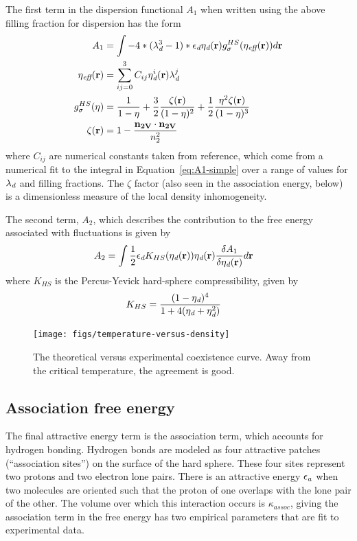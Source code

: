 \documentclass[letterpaper,twocolumn,amsmath,amssymb,prb]{revtex4-1}
\newcommand{\xx}{\textbf{r}}
\begin{document}
The first term in the dispersion functional $A_1$ when written using
the above filling fraction for dispersion has the form
\begin{align}
  A_1 &= \int
   -4*(\lambdadisp^3 - 1)*\epsilondisp \etadisp(\xx)
    g^{HS}_\sigma(\eta_\textit{eff}(\xx))
  d\xx \\
  \eta_\textit{eff}(\xx) &= \sum_{ij=0}^3 C_{ij}  \etadisp^i(\xx)
  \lambdadisp^j
  \\
  g_\sigma^{HS}(\eta) &= \frac{1}{1-\eta}
  +\frac32\frac{\zeta(\xx)}{(1-\eta)^2}
  + \frac12\frac{\eta^2\zeta(\xx)}{(1-\eta)^3}
  \\
  \zeta(\xx) &= 1 - \frac{\mathbf{n_{2V}}\cdot\mathbf{n_{2V}}}{n_2^2}
\end{align}
where $C_{ij}$ are numerical constants taken from
reference\cite{gil-villegas-1997-SAFT-VR}, which come from a numerical
fit to the integral in Equation~\ref{eq:A1-simple} over a range of
values for $\lambda_\textit{d}$ and filling fractions.  The $\zeta$ factor
(also seen in the association energy, below) is a dimensionless
measure of the local density inhomogeneity.

The second term, $A_2$, which describes the contribution to the free
energy associated with fluctuations is given by
\begin{align}
  A_2 &= \int \frac12 \epsilondisp
              K_{HS}(\etadisp(\xx))
              \etadisp(\xx)
              \frac{\delta A_1}{\delta \etadisp(\xx)}
                d\xx
\end{align}
where $K_{HS}$ is the Percus-Yevick hard-sphere compressibility, given
by
\begin{align}
  K_{HS} &=
    \frac{(1 - \eta_\textit{d})^4}{1 + 4(\eta_\textit{d} + \eta_\textit{d}^2)}
\end{align}

\begin{figure}
\begin{center}
\texttt{[image: figs/temperature-versus-density]}
\end{center}
\caption{The theoretical versus experimental coexistence curve. Away from
the critical temperature, the agreement is good. }
\label{fig:temperature-vs-density}
\end{figure}

\subsection{Association free energy}
The final attractive energy term is the association term, which
accounts for hydrogen bonding.  Hydrogen bonds are modeled as four
attractive patches (``association sites'') on the surface of the hard
sphere.  These four sites represent two protons and two electron lone
pairs.  There is an attractive energy $\epsilon_\textit{a}$ when
two molecules are oriented such that the proton of one overlaps
with the lone pair of the other.  The volume over which this
interaction occurs is $\kappa_\textit{assoc}$, giving the association
term in the free energy has two empirical parameters that are fit to
experimental data.
\end{document}

